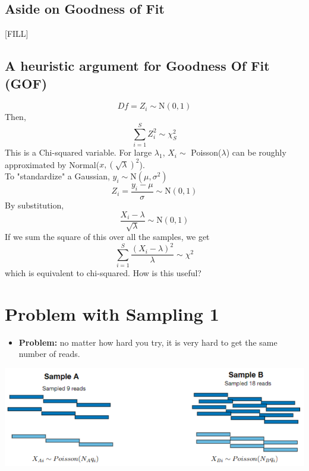 \documentclass[10pt]{article}
\begin{document}
\subsection*{Aside on Goodness of Fit}
[FILL]

\subsection*{A heuristic argument for Goodness Of Fit (GOF)}
\[Df = Z_i \sim \text{N}(0, 1)\]
Then,
\[\sum_{i = 1}^S Z_i^2 \sim \chi_S^2\]
This is a Chi-squared variable.  For large $\lambda_1$, $X_i \sim$ Poisson($\lambda$) can be roughly approximated by Normal($x, (\sqrt{\lambda})^2$).\\
To "standardize" a Gaussian, $y_i \sim \text{N}(\mu, \sigma^2)$
\[Z_i = \frac{y_i - \mu}{\sigma} \sim \text{N}(0, 1)\]
By substitution,
\[\frac{X_i - \lambda}{\sqrt{\lambda}} \sim \text{N}(0, 1)\]
If we sum the square of this over all the samples, we get
\[\sum_{i = 1}^S \frac{(X_i - \lambda)^2}{\lambda} \sim \chi^2\]
which is equivalent to chi-squared.  How is this useful?

\section*{Problem with Sampling 1}
\begin{itemize}
    \item \textbf{Problem:} no matter how hard you try, it is very hard to get the same number of reads.
\end{itemize}
\begin{center}
    \includegraphics*[scale=1]{W3_8.png}
\end{center}
\end{document}
